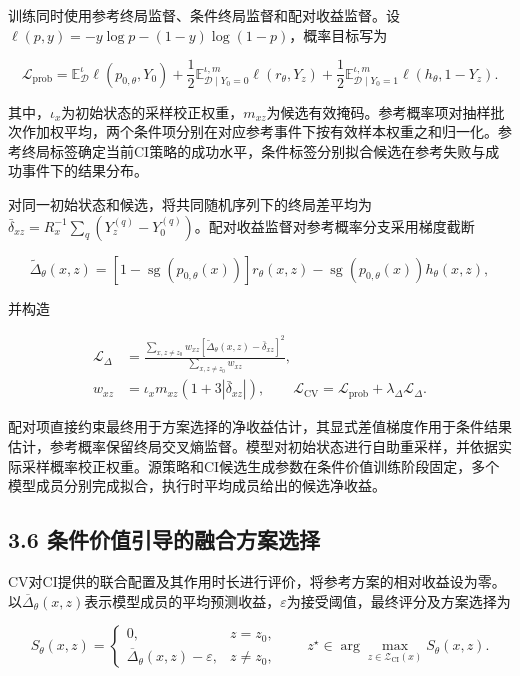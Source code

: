 \documentclass[UTF8,a4paper,zihao=5,fontset=none]{ctexart}
\begin{document}
训练同时使用参考终局监督、条件终局监督和配对收益监督。设\(\ell(p,y)=-y\log p-(1-y)\log(1-p)\)，概率目标写为

\[
\mathcal L_{\mathrm{prob}}
=\mathbb E_{\mathcal D}^{\iota}\ell(p_{0,\theta},Y_0)
+\frac12\mathbb E_{\mathcal D\mid Y_0=0}^{\iota,m}\ell(r_\theta,Y_z)
+\frac12\mathbb E_{\mathcal D\mid Y_0=1}^{\iota,m}\ell(h_\theta,1-Y_z).
\tag{29}
\]

其中，\(\iota_x\)为初始状态的采样校正权重，\(m_{xz}\)为候选有效掩码。参考概率项对抽样批次作加权平均，两个条件项分别在对应参考事件下按有效样本权重之和归一化。参考终局标签确定当前CI策略的成功水平，条件标签分别拟合候选在参考失败与成功事件下的结果分布。

对同一初始状态和候选，将共同随机序列下的终局差平均为\(\bar\delta_{xz}=R_x^{-1}\sum_q(Y_z^{(q)}-Y_0^{(q)})\)。配对收益监督对参考概率分支采用梯度截断

\[
\widetilde\Delta_\theta(x,z)
=[1-\operatorname{sg}(p_{0,\theta}(x))]r_\theta(x,z)
-\operatorname{sg}(p_{0,\theta}(x))h_\theta(x,z),
\tag{30}
\]

并构造

\[
\begin{aligned}
\mathcal L_\Delta
&=\frac{\displaystyle\sum_{x,z\ne z_0}w_{xz}
[\widetilde\Delta_\theta(x,z)-\bar\delta_{xz}]^2}
{\displaystyle\sum_{x,z\ne z_0}w_{xz}},\\
w_{xz}&=\iota_xm_{xz}(1+3|\bar\delta_{xz}|),
\qquad
\mathcal L_{\mathrm{CV}}=\mathcal L_{\mathrm{prob}}+\lambda_\Delta\mathcal L_\Delta.
\end{aligned}
\tag{31}
\]

配对项直接约束最终用于方案选择的净收益估计，其显式差值梯度作用于条件结果估计，参考概率保留终局交叉熵监督。模型对初始状态进行自助重采样，并依据实际采样概率校正权重。源策略和CI候选生成参数在条件价值训练阶段固定，多个模型成员分别完成拟合，执行时平均成员给出的候选净收益。

\subsection*{3.6
条件价值引导的融合方案选择}

CV对CI提供的联合配置及其作用时长进行评价，将参考方案的相对收益设为零。以\(\overline\Delta_\theta(x,z)\)表示模型成员的平均预测收益，\(\varepsilon\)为接受阈值，最终评分及方案选择为

\[
S_\theta(x,z)=
\begin{cases}
0,&z=z_0,\\
\overline\Delta_\theta(x,z)-\varepsilon,&z\ne z_0,
\end{cases}
\qquad
z^\star\in\arg\max_{z\in\mathcal Z_{\mathrm{CI}}(x)}S_\theta(x,z).
\tag{32}
\]
\end{document}
